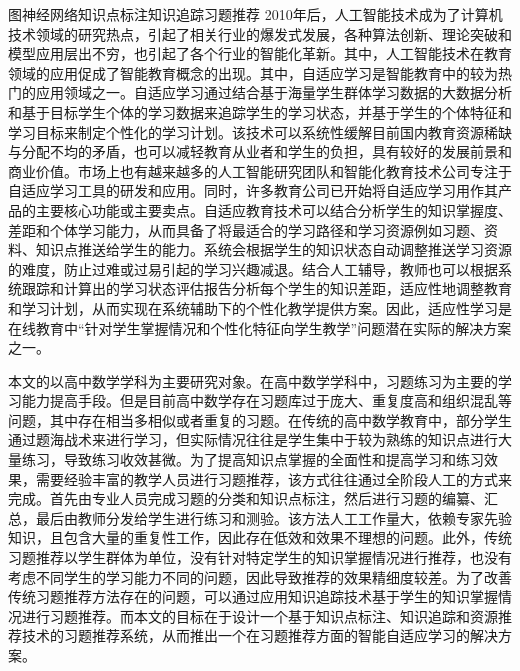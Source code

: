 
\begin{abstractC}{图神经网络}{知识点标注}{知识追踪}{习题推荐}{}
    2010年后，人工智能技术成为了计算机技术领域的研究热点，引起了相关行业的爆发式发展，各种算法创新、理论突破和模型应用层出不穷，也引起了各个行业的智能化革新。其中，人工智能技术在教育领域的应用促成了智能教育概念的出现。其中，自适应学习是智能教育中的较为热门的应用领域之一\cite{ma2017adalearn}。自适应学习通过结合基于海量学生群体学习数据的大数据分析和基于目标学生个体的学习数据来追踪学生的学习状态，并基于学生的个体特征和学习目标来制定个性化的学习计划\cite{soltani2019adaptive}。该技术可以系统性缓解目前国内教育资源稀缺与分配不均的矛盾，也可以减轻教育从业者和学生的负担，具有较好的发展前景和商业价值。市场上也有越来越多的人工智能研究团队和智能化教育技术公司专注于自适应学习工具的研发和应用。同时，许多教育公司已开始将自适应学习用作其产品的主要核心功能或主要卖点。自适应教育技术可以结合分析学生的知识掌握度、差距和个体学习能力，从而具备了将最适合的学习路径和学习资源例如习题、资料、知识点推送给学生的能力。系统会根据学生的知识状态自动调整推送学习资源的难度，防止过难或过易引起的学习兴趣减退。结合人工辅导，教师也可以根据系统跟踪和计算出的学习状态评估报告分析每个学生的知识差距，适应性地调整教育和学习计划，从而实现在系统辅助下的个性化教学提供方案。因此，适应性学习是在线教育中``针对学生掌握情况和个性化特征向学生教学''问题潜在实际的解决方案之一。

    本文的以高中数学学科为主要研究对象。在高中数学学科中，习题练习为主要的学习能力提高手段。但是目前高中数学存在习题库过于庞大、重复度高和组织混乱等问题，其中存在相当多相似或者重复的习题。在传统的高中数学教育中，部分学生通过题海战术来进行学习，但实际情况往往是学生集中于较为熟练的知识点进行大量练习，导致练习收效甚微。为了提高知识点掌握的全面性和提高学习和练习效果，需要经验丰富的教学人员进行习题推荐，该方式往往通过全阶段人工的方式来完成。首先由专业人员完成习题的分类和知识点标注，然后进行习题的编纂、汇总，最后由教师分发给学生进行练习和测验。该方法人工工作量大，依赖专家先验知识，且包含大量的重复性工作，因此存在低效和效果不理想的问题。此外，传统习题推荐以学生群体为单位，没有针对特定学生的知识掌握情况进行推荐，也没有考虑不同学生的学习能力不同的问题，因此导致推荐的效果精细度较差。为了改善传统习题推荐方法存在的问题，可以通过应用知识追踪技术基于学生的知识掌握情况进行习题推荐。而本文的目标在于设计一个基于知识点标注、知识追踪和资源推荐技术的习题推荐系统，从而推出一个在习题推荐方面的智能自适应学习的解决方案。


\end{abstractC}

